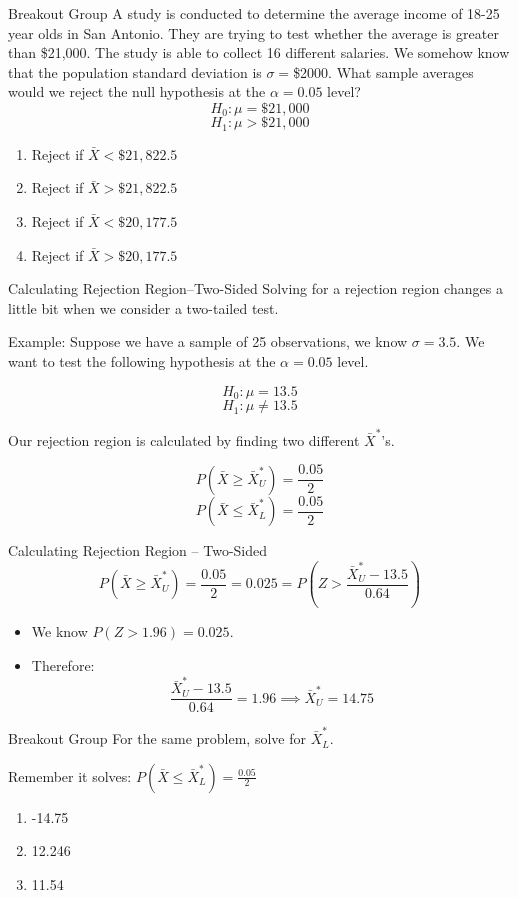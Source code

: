 \documentclass{beamer}
\begin{document}
\begin{frame}{Breakout Group}
	A study is conducted to determine the average income of 18-25 year olds in San Antonio. They are trying to test whether the average is greater than \$21,000. The study is able to collect 16 different salaries. We somehow know that the population standard deviation is $\sigma=$\$2000. What sample averages would we reject the null hypothesis at the $\alpha=0.05$ level?
	$$H_0: \mu=\$21,000$$
	$$H_1: \mu > \$21,000$$
	\begin{enumerate}[label=(\alph*)]
		\item Reject if $\bar{X} < \$21,822.5$
		\item Reject if $\bar{X} > \$21,822.5$
		\item Reject if $\bar{X} < \$20,177.5$
		\item Reject if $\bar{X} >\$20,177.5$
	\end{enumerate}
\end{frame}

\begin{frame}{Calculating Rejection Region--Two-Sided}
	Solving for a rejection region changes a little bit when we consider a two-tailed test.
	
	Example: Suppose we have a sample of 25 observations, we know $\sigma=3.5$. We want to test the following hypothesis at the $\alpha=0.05$ level. 

	$$H_0: \mu=13.5$$
	$$H_1: \mu \neq 13.5$$

	Our rejection region is calculated by finding two different $\bar{X}^*$'s.

	$$P(\bar{X}\geq\bar{X}^*_U)=\frac{0.05}{2}$$
	$$P(\bar{X}\leq\bar{X}^*_L)=\frac{0.05}{2}$$

\end{frame}

\frame{}
\frame{}

\begin{frame}{Calculating Rejection Region -- Two-Sided}
	$$P(\bar{X}\geq\bar{X}^*_U)= \frac{0.05}{2} = 0.025 = P(Z>\frac{\bar{X}^*_U-13.5}{0.64})$$
	\begin{itemize}
		\item  We know $P(Z>1.96)=0.025$. 
		
		\item Therefore: $$\frac{\bar{X}^*_U-13.5}{0.64}=1.96 \implies \bar{X}^*_U=14.75$$
	\end{itemize}
\end{frame}

\begin{frame}{Breakout Group}
	For the same problem, solve for $\bar{X}^*_L$.
	
	\vspace{5mm}
	Remember it solves: $P(\bar{X}\leq\bar{X}^*_L)=\frac{0.05}{2}$
	
	\begin{enumerate}[label=(\alph*)]
		\item -14.75
		\item 12.246
		\item 11.54
	\end{enumerate}
\end{frame}
\end{document}
